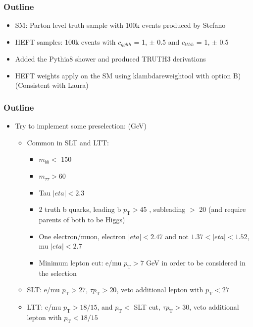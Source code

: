 \documentclass[twoside,11pt]{beamer}
\newcommand{\pT}{\ensuremath{p_{\mathrm T}}}
\begin{document}
\subtitle{HEFT reweighting uncertainties}
\author{Zhiyuan Jordan Li}
\date{\today}

\titlepage
\begin{frame}
    \frametitle{Outline}
    \begin{itemize}
        \item SM: Parton level truth sample with 100k events produced by Stefano
        \item HEFT samples: 100k events with $c_{gghh}$ = 1, $\pm$ 0.5 and $c_{tthh}$ = 1, $\pm$ 0.5
        \item Added the Pythia8 shower and produced TRUTH3 derivations 
        \item HEFT weights apply on the SM using klambdareweightool with option B) (Consistent with Laura)
        \end{itemize}
\end{frame}


\begin{frame}
    \frametitle{Outline}
    \begin{itemize}


     \item   Try to implement some preselection: (GeV)
     \begin{itemize}
        \item Common in SLT and LTT:
        \begin{itemize}
        \item $m_{bb} <$  150 
        \item $m_{\tau\tau} > 60$
        \item Tau $|eta| < 2.3$
        \item 2 truth b quarks, leading b $\pT > 45$ , subleading $>$ 20 (and require parents of both to be Higgs)
        \item One electron/muon, electron $|eta| < 2.47$ and not $1.37 < |eta| < 1.52$, mu $|eta| < 2.7$
        \item Minimum lepton cut: e/mu $\pT > 7$ GeV in order to be considered in the selection
        \end{itemize}
        \item SLT: e/mu $\pT > 27$, $\tau \pT > 20$, veto additional lepton with $\pT < 27$
        \item LTT:  e/mu $\pT > 18/15$, and $\pT <$ SLT cut, $\tau \pT > 30$, veto additional lepton with $\pT < 18/15$
    \end{itemize}
\end{itemize}
\end{frame}
\end{document}
